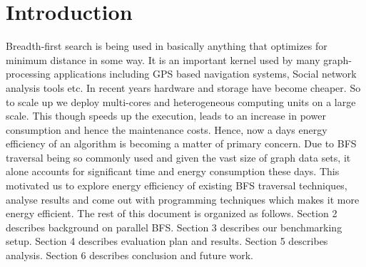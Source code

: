 \section{Introduction}
\label{intro}

Breadth-first search is being used
in basically anything that optimizes for minimum distance in some way.
It is an important kernel used by many graph-processing applications including
GPS based navigation systems, Social network analysis tools etc.\newline
In recent years hardware and storage have become cheaper. So to scale up we deploy
multi-cores and heterogeneous computing units on a large scale. This though speeds
up the execution, leads to an increase in power consumption and hence the
maintenance costs. Hence, now a days energy efficiency of an algorithm is becoming a
matter of primary concern.\newline
Due to BFS traversal being so commonly used and given the vast size of graph
data sets, it alone accounts for significant time and energy consumption these days.
This motivated us to explore energy efficiency of existing BFS traversal
techniques, analyse results and come out with programming techniques which makes
it more energy efficient.\newline
The rest of this document is organized as follows.  Section 2
describes background on parallel BFS.
Section 3 describes our benchmarking setup.  Section 4 describes evaluation plan
and results.  Section 5 describes analysis.  Section 6 describes
conclusion and future work.

